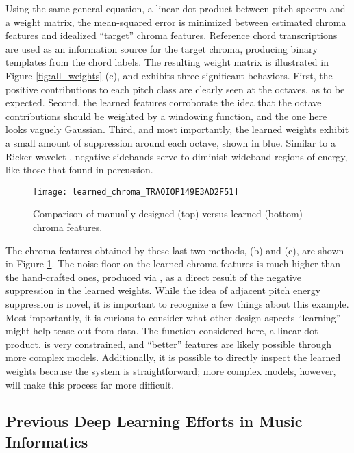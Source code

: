 Using the same general equation, a linear dot product between pitch spectra and a weight matrix, the mean-squared error is minimized between estimated chroma features and idealized ``target'' chroma features.
Reference chord transcriptions are used as an information source for the target chroma, producing binary templates from the chord labels.
The resulting weight matrix is illustrated in Figure \ref{fig:all_weights}-(c), and exhibits three significant behaviors.
First, the positive contributions to each pitch class are clearly seen at the octaves, as to be expected.
Second, the learned features corroborate the idea that the octave contributions should be weighted by a windowing function, and the one here looks vaguely Gaussian.
Third, and most importantly, the learned weights exhibit a small amount of suppression around each octave, shown in blue.
Similar to a Ricker wavelet \cite{mexihat}, negative sidebands serve to diminish wideband regions of energy, like those that found in percussion.


\begin{figure}
\begin{centering}
\texttt{[image: learned\_chroma\_TRAOIOP149E3AD2F51]}
\caption{Comparison of manually designed (top) versus learned (bottom) chroma features.}
\label{fig:learned_chroma}
\end{centering}
\end{figure}

The chroma features obtained by these last two methods, (b) and (c), are shown in Figure \ref{fig:learned_chroma}.
The noise floor on the learned chroma features is much higher than the hand-crafted ones, produced via \cite{Cho2014}, as a direct result of the negative suppression in the learned weights.
While the idea of adjacent pitch energy suppression is novel, it is important to recognize a few things about this example.
Most importantly, it is curious to consider what other design aspects ``learning'' might help tease out from data.
The function considered here, a linear dot product, is very constrained, and ``better'' features are likely possible through more complex models.
Additionally, it is possible to directly inspect the learned weights because the system is straightforward; more complex models, however, will make this process far more difficult.


\subsection{Previous Deep Learning Efforts in Music Informatics}

